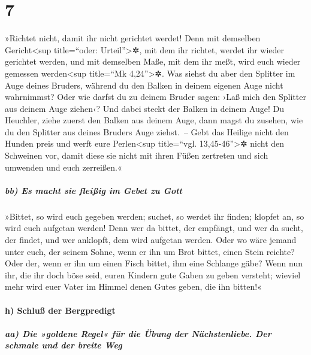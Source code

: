 \hypertarget{section-6}{%
\section{7}\label{section-6}}

 »Richtet nicht, damit ihr nicht gerichtet werdet!
 Denn mit demselben Gericht\textless sup title=``oder:
Urteil''\textgreater✲, mit dem ihr richtet, werdet ihr wieder gerichtet
werden, und mit demselben Maße, mit dem ihr meßt, wird euch wieder
gemessen werden\textless sup title=``Mk 4,24''\textgreater✲.
 Was siehst du aber den Splitter im Auge deines Bruders,
während du den Balken in deinem eigenen Auge nicht wahrnimmst?
 Oder wie darfst du zu deinem Bruder sagen: ›Laß mich den
Splitter aus deinem Auge ziehen‹? Und dabei steckt der Balken in deinem
Auge!  Du Heuchler, ziehe zuerst den Balken aus deinem
Auge, dann magst du zusehen, wie du den Splitter aus deines Bruders Auge
ziehst.~--  Gebt das Heilige nicht den Hunden preis und
werft eure Perlen\textless sup title=``vgl. 13,45-46''\textgreater✲
nicht den Schweinen vor, damit diese sie nicht mit ihren Füßen zertreten
und sich umwenden und euch zerreißen.«

\hypertarget{bb-es-macht-sie-fleiuxdfig-im-gebet-zu-gott}{%
\subparagraph{bb) Es macht sie fleißig im Gebet zu
Gott}\label{bb-es-macht-sie-fleiuxdfig-im-gebet-zu-gott}}

 »Bittet, so wird euch gegeben werden; suchet, so werdet
ihr finden; klopfet an, so wird euch aufgetan werden! 
Denn wer da bittet, der empfängt, und wer da sucht, der findet, und wer
anklopft, dem wird aufgetan werden.  Oder wo wäre jemand
unter euch, der seinem Sohne, wenn er ihn um Brot bittet, einen Stein
reichte?  Oder der, wenn er ihn um einen Fisch bittet,
ihm eine Schlange gäbe?  Wenn nun ihr, die ihr doch böse
seid, euren Kindern gute Gaben zu geben versteht; wieviel mehr wird euer
Vater im Himmel denen Gutes geben, die ihn bitten!«

\hypertarget{h-schluuxdf-der-bergpredigt}{%
\paragraph{h) Schluß der
Bergpredigt}\label{h-schluuxdf-der-bergpredigt}}

\hypertarget{aa-die-goldene-regel-fuxfcr-die-uxfcbung-der-nuxe4chstenliebe.-der-schmale-und-der-breite-weg}{%
\subparagraph{aa) Die »goldene Regel« für die Übung der Nächstenliebe.
Der schmale und der breite
Weg}\label{aa-die-goldene-regel-fuxfcr-die-uxfcbung-der-nuxe4chstenliebe.-der-schmale-und-der-breite-weg}}

